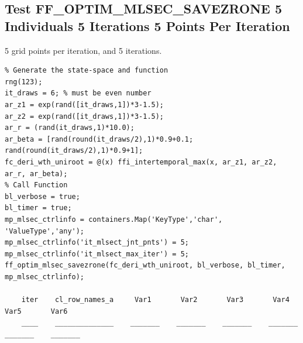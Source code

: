 \documentclass[
]{book}
\begin{document}
\hypertarget{test-ff_optim_mlsec_savezrone-5-individuals-5-iterations-5-points-per-iteration}{%
\subsection{Test FF\_OPTIM\_MLSEC\_SAVEZRONE 5 Individuals 5 Iterations 5 Points Per Iteration}\label{test-ff_optim_mlsec_savezrone-5-individuals-5-iterations-5-points-per-iteration}}

5 grid points per iteration, and 5 iterations.

\begin{verbatim}
% Generate the state-space and function
rng(123);
it_draws = 6; % must be even number
ar_z1 = exp(rand([it_draws,1])*3-1.5);
ar_z2 = exp(rand([it_draws,1])*3-1.5);
ar_r = (rand(it_draws,1)*10.0);
ar_beta = [rand(round(it_draws/2),1)*0.9+0.1; rand(round(it_draws/2),1)*0.9+1]; 
fc_deri_wth_uniroot = @(x) ffi_intertemporal_max(x, ar_z1, ar_z2, ar_r, ar_beta);
% Call Function
bl_verbose = true;
bl_timer = true;
mp_mlsec_ctrlinfo = containers.Map('KeyType','char', 'ValueType','any');
mp_mlsec_ctrlinfo('it_mlsect_jnt_pnts') = 5;
mp_mlsec_ctrlinfo('it_mlsect_max_iter') = 5;
ff_optim_mlsec_savezrone(fc_deri_wth_uniroot, bl_verbose, bl_timer, mp_mlsec_ctrlinfo);

    iter    cl_row_names_a     Var1       Var2       Var3       Var4       Var5       Var6  
    ____    ______________    _______    _______    _______    _______    _______    _______


\end{verbatim}
\end{document}
